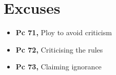 \chapter{Excuses}

\begin{itemize}
\tightlist
\item
  \textbf{Pc 71,} Ploy to avoid criticism
\item
  \textbf{Pc 72,} Criticising the rules
\item
  \textbf{Pc 73,} Claiming ignorance
\end{itemize}

